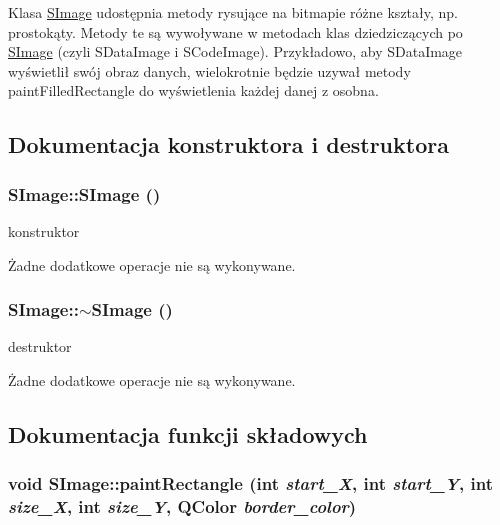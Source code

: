 Klasa \hyperlink{classSImage}{SImage} udostępnia metody rysujące na bitmapie różne kształy, np. prostokąty. Metody te są wywoływane w metodach klas dziedziczących po \hyperlink{classSImage}{SImage} (czyli SDataImage i SCodeImage). Przykładowo, aby SDataImage wyświetlił swój obraz danych, wielokrotnie będzie uzywał metody paintFilledRectangle do wyświetlenia każdej danej z osobna. 

\subsection{Dokumentacja konstruktora i destruktora}
\hypertarget{classSImage_76e408c8c9d80017ab4bcdcb4788de15}{
\subsubsection{\setlength{\rightskip}{0pt plus 5cm}SImage::SImage ()}}
\label{classSImage_76e408c8c9d80017ab4bcdcb4788de15}


konstruktor 

Żadne dodatkowe operacje nie są wykonywane. \hypertarget{classSImage_615b1cbc644a5d8b88fd6ec1efa8c732}{
\subsubsection{\setlength{\rightskip}{0pt plus 5cm}SImage::$\sim$SImage ()}}
\label{classSImage_615b1cbc644a5d8b88fd6ec1efa8c732}


destruktor 

Żadne dodatkowe operacje nie są wykonywane. 

\subsection{Dokumentacja funkcji składowych}
\hypertarget{classSImage_d5707899d17b97884f85d3ea42bd548d}{
\subsubsection{\setlength{\rightskip}{0pt plus 5cm}void SImage::paintRectangle (int {\em start\_\-X}, \/  int {\em start\_\-Y}, \/  int {\em size\_\-X}, \/  int {\em size\_\-Y}, \/  QColor {\em border\_\-color})}}
\label{classSImage_d5707899d17b97884f85d3ea42bd548d}


